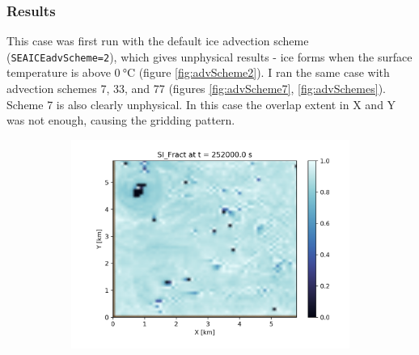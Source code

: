 \documentclass[11pt]{article}
\begin{document}
\subsubsection{Results}
This case was first run with the default ice advection scheme (\verb|SEAICEadvScheme=2|), which gives unphysical results - ice forms when the surface temperature is above $\SI{0}{\celsius}$ (figure \ref{fig:advScheme2}). I ran the same case with advection schemes 7, 33, and 77 (figures \ref{fig:advScheme7}, \ref{fig:advSchemes}). Scheme 7 is also clearly unphysical. In this case the overlap extent in X and Y was not enough, causing the gridding pattern.
\pagebreak

\clearpage

\begin{figure}[h!]
\centering
	\begin{subfigure}{0.85\textwidth}
		\includegraphics[width=\textwidth]{iceAdvect/advScheme-def-surface-ice-hd-0000025200.png}
	\end{subfigure}
 

\end{figure}
\end{document}
